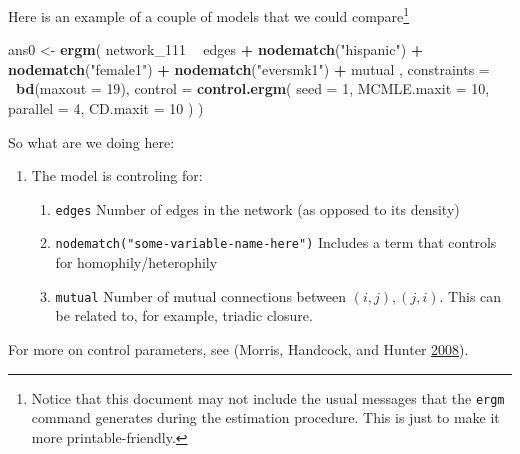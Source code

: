 \documentclass[]{book}
\newenvironment{Shaded}{\begin{snugshade}}{\end{snugshade}}
\newcommand{\KeywordTok}[1]{\textcolor[rgb]{0.13,0.29,0.53}{\textbf{#1}}}
\newcommand{\DataTypeTok}[1]{\textcolor[rgb]{0.13,0.29,0.53}{#1}}
\newcommand{\DecValTok}[1]{\textcolor[rgb]{0.00,0.00,0.81}{#1}}
\newcommand{\StringTok}[1]{\textcolor[rgb]{0.31,0.60,0.02}{#1}}
\newcommand{\OperatorTok}[1]{\textcolor[rgb]{0.81,0.36,0.00}{\textbf{#1}}}
\newcommand{\NormalTok}[1]{#1}
\let\rmarkdownfootnote\footnote%
\def\footnote{\protect\rmarkdownfootnote}
\theoremstyle{definition}
\theoremstyle{definition}
\theoremstyle{definition}
\theoremstyle{remark}
\begin{document}
Here is an example of a couple of models that we could compare\footnote{Notice
  that this document may not include the usual messages that the
  \texttt{ergm} command generates during the estimation procedure. This
  is just to make it more printable-friendly.}

\begin{Shaded}
\begin{Highlighting}[]
\NormalTok{ans0 <-}\StringTok{ }\KeywordTok{ergm}\NormalTok{(}
\NormalTok{  network_}\DecValTok{111} \OperatorTok{~}
\StringTok{    }\NormalTok{edges }\OperatorTok{+}
\StringTok{    }\KeywordTok{nodematch}\NormalTok{(}\StringTok{"hispanic"}\NormalTok{) }\OperatorTok{+}
\StringTok{    }\KeywordTok{nodematch}\NormalTok{(}\StringTok{"female1"}\NormalTok{) }\OperatorTok{+}
\StringTok{    }\KeywordTok{nodematch}\NormalTok{(}\StringTok{"eversmk1"}\NormalTok{) }\OperatorTok{+}
\StringTok{    }\NormalTok{mutual}
\NormalTok{    ,}
  \DataTypeTok{constraints =} \OperatorTok{~}\KeywordTok{bd}\NormalTok{(}\DataTypeTok{maxout =} \DecValTok{19}\NormalTok{),}
  \DataTypeTok{control =} \KeywordTok{control.ergm}\NormalTok{(}
    \DataTypeTok{seed        =} \DecValTok{1}\NormalTok{,}
    \DataTypeTok{MCMLE.maxit =} \DecValTok{10}\NormalTok{,}
    \DataTypeTok{parallel    =} \DecValTok{4}\NormalTok{,}
    \DataTypeTok{CD.maxit    =} \DecValTok{10}
\NormalTok{    )}
\NormalTok{  )}
\end{Highlighting}
\end{Shaded}

So what are we doing here:

\begin{enumerate}
\def\labelenumi{\arabic{enumi}.}
\item
  The model is controling for:

  \begin{enumerate}
  \def\labelenumii{\alph{enumii}.}
  \item
    \texttt{edges} Number of edges in the network (as opposed to its
    density)
  \item
    \texttt{nodematch("some-variable-name-here")} Includes a term that
    controls for homophily/heterophily
  \item
    \texttt{mutual} Number of mutual connections between
    \((i, j), (j, i)\). This can be related to, for example, triadic
    closure.
  \end{enumerate}
\end{enumerate}

For more on control parameters, see (Morris, Handcock, and Hunter
\protect\hyperlink{ref-Morris2008}{2008}).
\end{document}

